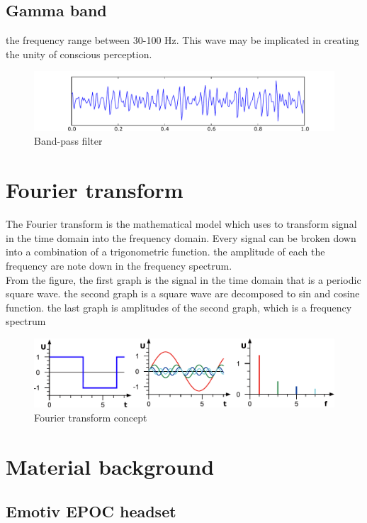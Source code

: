 \subsection{Gamma band}the frequency range between 30-100 Hz. This wave may be implicated in creating the unity of conscious perception. 
\begin{figure}[ht]
	\centering
	\includegraphics[scale = 0.14]{chapter3/Eeg_gamma.pdf}
	\caption{Band-pass filter}
\end{figure}

\section{Fourier transform}
The Fourier transform is the mathematical model which uses to transform signal in the time domain into the frequency domain. Every signal can be broken down into a combination of a trigonometric function.  the amplitude of each the frequency are note down in the frequency spectrum. \\
From the figure, the first graph is the signal in the time domain that is a periodic square wave. the second graph is a square wave are decomposed to sin and cosine function. the last graph is amplitudes of the second graph, which is a frequency spectrum \\
\begin{figure}[ht]
	\centering
	\includegraphics[scale = 0.75]{chapter3/ft.pdf}
	\caption{Fourier transform concept\cite{ft}}
\end{figure}

\newpage
\section{Material background}

\subsection{Emotiv EPOC headset\cite{ref12}}

